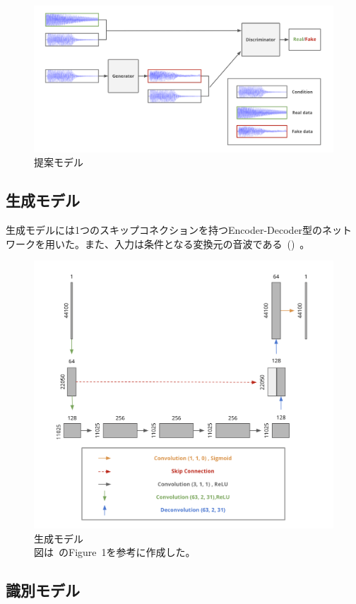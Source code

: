 \clearpage

\begin{figure}[t]
\centering
\includegraphics[width=0.8\columnwidth]{figure/pr_model.png}
\caption[本研究の提案モデル]{提案モデル}
\label{fig:pr_model}
\end{figure}

\subsection{生成モデル}

生成モデルには1つのスキップコネクションを持つEncoder-Decoder型のネットワークを用いた。また、入力は条件となる変換元の音波である~()~。

\begin{figure}[b]
\centering
\includegraphics[width=0.6\columnwidth]{figure/pr_generator.png}
\caption[本研究の生成モデル]{生成モデル\\
図は~\cite{u-net}のFigure~1を参考に作成した。}
\label{fig:pr_gen}
\end{figure}

\clearpage

\subsection{識別モデル}

